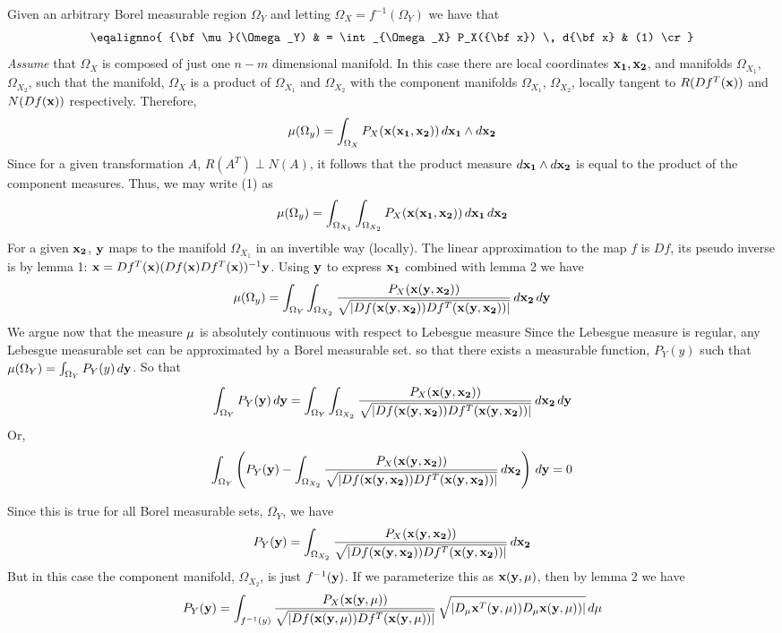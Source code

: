 Given an arbitrary Borel measurable region $\Omega_Y$ and letting
$\Omega_X = f^{-1}(\Omega_Y)$ we have that
$$
\eqalignno{
{\bf \mu}(\Omega_Y) & = 
\int_{\Omega_X} P_X({\bf x}) \, d{\bf x} & (1) \cr
}
$$
{\it Assume\/} that $\Omega_X$ is composed of just one $n-m$ dimensional
manifold. In this case there are local coordinates ${\bf x_1}, {\bf x_2}$, 
and manifolds $\Omega_{X_1}$, $\Omega_{X_2}$, such that the     manifold, 
$\Omega_X$ is a product of $\Omega_{X_1}$ and $\Omega_{X_2}$ with
the component manifolds $\Omega_{X_1}$, $\Omega_{X_2}$, 
locally tangent to $R(Df^T({\bf x}))$ and $N(Df({\bf x}))$ respectively.
Therefore,
$$
{\bf \mu}(\Omega_y) = 
\int_{\Omega_X} P_X({\bf x}({\bf x_1}, {\bf x_2})) \, 
d{\bf x_1} \wedge d{\bf x_2}
$$
Since for a given transformation $A$, $R(A^T) \perp N(A)$, it follows
that the product measure $d{\bf x_1} \wedge d{\bf x_2}$ is equal to 
the product of the component measures.
Thus, we may write (1) as 
$$
{\bf \mu}(\Omega_y) = 
\int_{\Omega_{X_1}} \int_{\Omega_{X_2}} 
P_X({\bf x}({\bf x_1}, {\bf x_2})) \, d{\bf x_1} \, d{\bf x_2}
$$
For a given ${\bf x_2}$, ${\bf y}$ maps to the manifold $\Omega_{X_1}$ in an 
invertible way (locally). The linear approximation to the map $f$ is $Df$, its
pseudo inverse is by lemma 1:
${\bf x} = Df^T({\bf x}) (Df({\bf x}) Df^T({\bf x}))^{-1} {\bf y}$.
Using ${\bf y}$ to express ${\bf x_1}$ combined with lemma 2 we have
$$
{\bf \mu}(\Omega_y) = 
\int_{\Omega_Y} \int_{\Omega_{X_2}} 
{P_X({\bf x}({\bf y}, {\bf x_2})) \over 
\sqrt{ |Df({\bf x}({\bf y}, {\bf x_2})) Df^T({\bf x}({\bf y}, {\bf x_2}))| } }
\, d{\bf x_2} \, d{\bf y}
$$
We argue now that the measure ${\bf \mu}$ is absolutely continuous with 
respect to Lebesgue measure%
 {Since the Lebesgue measure is regular, any Lebesgue measurable set can be approximated by a Borel measurable set.} 
so that there exists a measurable function, $P_Y(y)$
such that $\mu(\Omega_Y) = \int_{\Omega_Y} P_Y(y) \, d{\bf y}$.
So that
$$
\int_{\Omega_Y} P_Y({\bf y})\, d{\bf y} =
\int_{\Omega_Y} \int_{\Omega_{X_2}} 
{P_X({\bf x}({\bf y}, {\bf x_2})) \over 
\sqrt{ |Df({\bf x}({\bf y}, {\bf x_2})) Df^T({\bf x}({\bf y}, {\bf x_2}))| } }
\, d{\bf x_2} \, d{\bf y}
$$
Or,
$$
\int_{\Omega_Y} \left( P_Y({\bf y}) - 
 \int_{\Omega_{X_2}} 
{P_X({\bf x}({\bf y}, {\bf x_2})) \over 
\sqrt{ |Df({\bf x}({\bf y}, {\bf x_2})) Df^T({\bf x}({\bf y}, {\bf x_2}))| } }
\, d{\bf x_2} \right) \, d{\bf y} = 0
$$

Since this is true for all Borel measurable sets, $\Omega_Y$, we have
$$
P_Y({\bf y}) =
\int_{\Omega_{X_2}} 
{P_X({\bf x}({\bf y}, {\bf x_2})) \over 
\sqrt{ |Df({\bf x}({\bf y}, {\bf x_2})) Df^T({\bf x}({\bf y}, {\bf x_2}))| } }
\,  d{\bf x_2}
$$
But in this case the component manifold, $\Omega_{X_2}$, is just $f^{-1}({\bf y})$.
If we parameterize this as ${\bf x}({\bf y}, {\bf \mu})$, then by lemma 2 we
have
$$
P_Y({\bf y}) =
\int_{f^{-1}(y)}
{P_X({\bf x}({\bf y}, {\bf \mu})) \over 
\sqrt{ |Df({\bf x}({\bf y}, {\bf \mu})) Df^T({\bf x}({\bf y}, {\bf \mu})) | } }
\,  \sqrt{|D_{{\bf \mu}}{\bf x}^T({\bf y}, {\bf \mu})) 
D_{{\bf \mu}}{\bf x}({\bf y}, {\bf \mu})) | } \, d{\bf \mu}
$$

